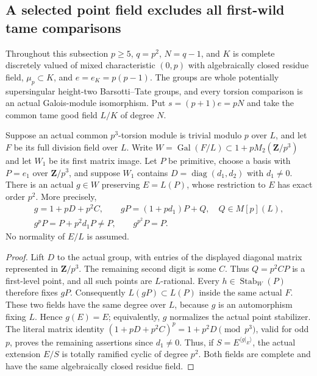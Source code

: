 \subsection{A selected point field excludes all first-wild tame comparisons}

Throughout this subsection $p\ge5$, $q=p^2$, $N=q-1$, and
$K$ is complete discretely valued of mixed characteristic
$(0,p)$ with algebraically closed residue field,
$\mu_p\subset K$, and $e=e_K=p(p-1)$.
The groups are whole potentially supersingular height-two
Barsotti--Tate groups, and every torsion comparison is an actual
Galois-module isomorphism. Put $s=(p+1)e=pN$ and take the
common tame good field $L/K$ of degree $N$.

\begin{lemma}
\label{lem:B-RD103-point}
Suppose an actual common $p^3$-torsion module is trivial modulo $p$
over $L$, and let $F$ be its full division field over $L$.
Write $W=\operatorname{Gal}(F/L)\subset1+pM_2(\mathbf Z/p^3)$
and let $W_1$ be its first matrix image.
Let $P$ be primitive, choose a basis with $P=e_1$ over
$\mathbf Z/p^3$, and suppose $W_1$ contains
$D=\operatorname{diag}(d_1,d_2)$ with $d_1\ne0$.
There is an actual $g\in W$ preserving $E=L(P)$, whose restriction
to $E$ has exact order $p^2$. More precisely,
\[
 \begin{gathered}
 g=1+pD+p^2C,\qquad
 gP=(1+pd_1)P+Q,\quad Q\in M[p](L),\\
 g^pP=P+p^2d_1P\ne P,\qquad g^{p^2}P=P .
 \end{gathered}                                      \tag{B-RD103.1}
\]
No normality of $E/L$ is assumed.
\end{lemma}
\begin{proof}
Lift $D$ to the actual group, with entries of the displayed
diagonal matrix represented in $\mathbf Z/p^3$. The remaining
second digit is some $C$. Thus $Q=p^2CP$ is a first-level point,
and all such points are $L$-rational.
Every $h\in\operatorname{Stab}_W(P)$ therefore fixes $gP$.
Consequently $L(gP)\subset L(P)$ inside the same actual $F$.
These two fields have the same degree over $L$, because $g$
is an automorphism fixing $L$. Hence $g(E)=E$; equivalently,
$g$ normalizes the actual point stabilizer.
The literal matrix identity
$(1+pD+p^2C)^p=1+p^2D\pmod{p^3}$, valid for odd $p$,
proves the remaining assertions since $d_1\ne0$.
Thus, if $S=E^{\langle g|_E\rangle}$, the actual extension
$E/S$ is totally ramified cyclic of degree $p^2$.
Both fields are complete and have the same algebraically
closed residue field.
\end{proof}

